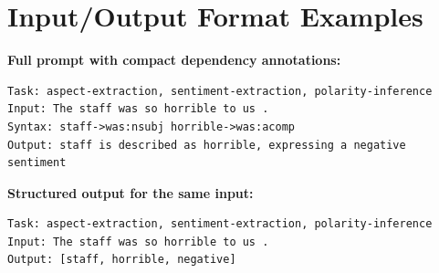 \documentclass[12pt,a4paper]{report}
\begin{document}
\section{Input/Output Format Examples}

\textbf{Full prompt with compact dependency annotations:}
\begin{lstlisting}
Task: aspect-extraction, sentiment-extraction, polarity-inference
Input: The staff was so horrible to us .
Syntax: staff->was:nsubj horrible->was:acomp
Output: staff is described as horrible, expressing a negative sentiment
\end{lstlisting}

\textbf{Structured output for the same input:}
\begin{lstlisting}
Task: aspect-extraction, sentiment-extraction, polarity-inference
Input: The staff was so horrible to us .
Output: [staff, horrible, negative]
\end{lstlisting}


\clearpage
{}


\end{document}
